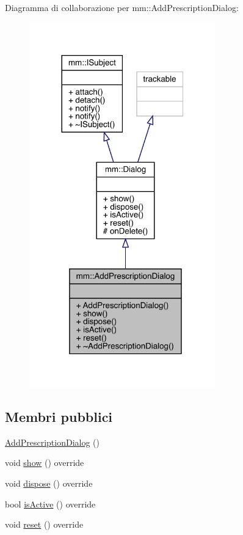 Diagramma di collaborazione per mm\+:\+:Add\+Prescription\+Dialog\+:\nopagebreak
\begin{figure}[H]
\begin{center}
\leavevmode
\includegraphics[width=228pt]{d6/dff/classmm_1_1_add_prescription_dialog__coll__graph}
\end{center}
\end{figure}
\subsection*{Membri pubblici}
\begin{DoxyCompactItemize}
\item 
\hyperlink{classmm_1_1_add_prescription_dialog_a0956469781e124fbfd283212bf1796ec}{Add\+Prescription\+Dialog} ()
\item 
void \hyperlink{classmm_1_1_add_prescription_dialog_aa1c86141b2d45e141684bd99d557b8e4}{show} () override
\item 
void \hyperlink{classmm_1_1_add_prescription_dialog_aacb58c7617be2323d91cd5ab2f28e354}{dispose} () override
\item 
bool \hyperlink{classmm_1_1_add_prescription_dialog_a4ff93500e8fd90512dc4575147b2c910}{is\+Active} () override
\item 
void \hyperlink{classmm_1_1_add_prescription_dialog_a6ace04587432a197436bb04c7b68d60d}{reset} () override
\end{DoxyCompactItemize}


